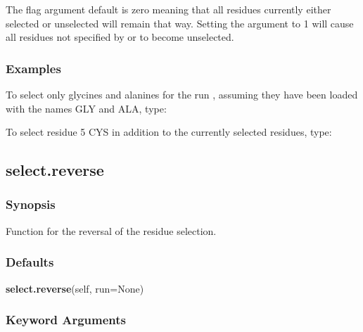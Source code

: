  The  flag argument default is zero meaning that all residues currently either selected or unselected will remain that way.  Setting the argument to 1 will cause all residues not specified by  or  to become unselected. 
  

  
 \subsubsection{Examples} 

 To select only glycines and alanines for the run , assuming they have been loaded with the names GLY and ALA, type: 
  



 To select residue 5 CYS in addition to the currently selected residues, type: 
  






  

 \newpage 

 \subsection{select.reverse} 

  
 \subsubsection{Synopsis} 

 Function for the reversal of the residue selection. 
  

  
 \subsubsection{Defaults} 

 \textsf{\textbf{select.reverse}(self, run=None)} 

  
 \subsubsection{Keyword Arguments} 

